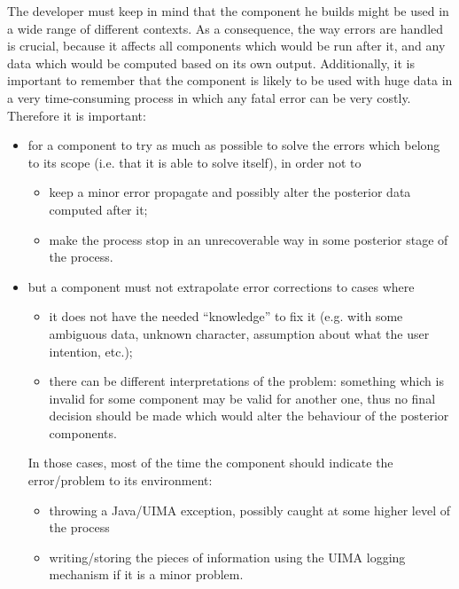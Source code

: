 \documentclass{article}
\newenvironment{xitemize}{
\begin{itemize}
  \setlength{\itemsep}{.3\baselineskip}
  \setlength{\topsep}{0pt}
  \setlength{\parskip}{0pt}
  \setlength{\parsep}{0pt}
}{\end{itemize}}
\begin{document}
The developer must keep in mind that the component he builds might be used in a wide range of different contexts. As a consequence, the way errors are handled is crucial, because it affects all components which would be run after it, and any data which would be computed based on its own output. Additionally, it is important to remember that the component is likely to be used with huge data in a very time-consuming process in which any fatal error can be very costly. Therefore it is important:
\begin{xitemize}
\item for a component to try as much as possible to solve the errors which belong to  its scope (i.e. that it is able to solve itself), in order not to 
\begin{xitemize}
\item keep a minor error propagate and possibly alter the posterior data computed after it;
\item make the process stop in an unrecoverable way in some posterior stage of the process.
\end{xitemize}
\item but a component must not extrapolate error corrections to cases where 
\begin{xitemize}
\item it does not have the needed ``knowledge'' to fix it (e.g. with some ambiguous data, unknown character, assumption about what the user intention, etc.);
\item there can be different interpretations of the problem: something which is invalid for some component may be valid for another one, thus no final decision should be made which would alter the behaviour of the posterior components. 
\end{xitemize} 
In those cases, most of the time the component should indicate the error/problem to its environment:
\begin{xitemize}
\item throwing a Java/UIMA exception, possibly caught at some higher level of the process
\item writing/storing the pieces of information using the UIMA logging mechanism if it is a minor problem.
\end{xitemize}
\end{xitemize}
\end{document}
